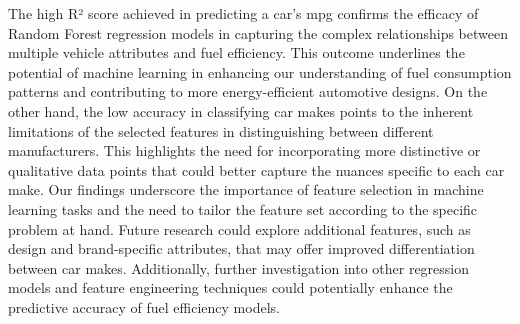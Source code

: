 \documentclass[a4paper, twocolumn]{article}
\begin{document}
The high R² score achieved in predicting a car's mpg confirms the efficacy of Random Forest regression models in capturing the complex relationships between multiple vehicle attributes and fuel efficiency. This outcome underlines the potential of machine learning in enhancing our understanding of fuel consumption patterns and contributing to more energy-efficient automotive designs.
On the other hand, the low accuracy in classifying car makes points to the inherent limitations of the selected features in distinguishing between different manufacturers. This highlights the need for incorporating more distinctive or qualitative data points that could better capture the nuances specific to each car make.
Our findings underscore the importance of feature selection in machine learning tasks and the need to tailor the feature set according to the specific problem at hand. Future research could explore additional features, such as design and brand-specific attributes, that may offer improved differentiation between car makes. Additionally, further investigation into other regression models and feature engineering techniques could potentially enhance the predictive accuracy of fuel efficiency models.

\printbibliography
\end{document}
